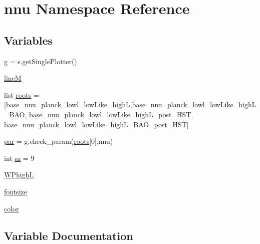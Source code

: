 \hypertarget{namespacennu}{}\section{nnu Namespace Reference}
\label{namespacennu}
\subsection*{Variables}
\begin{DoxyCompactItemize}
\item 
\mbox{\hyperlink{namespacennu_aad23f333e444d294373fe24e7fb3b692}{g}} = s.\+get\+Single\+Plotter()
\item 
\mbox{\hyperlink{namespacennu_acd5b6cec06952e5964a9e349bf5c1155}{lineM}}
\item 
list \mbox{\hyperlink{namespacennu_af565fbca18851eea4ad5e271bb575879}{roots}} = \mbox{[}\textquotesingle{}base\+\_\+nnu\+\_\+planck\+\_\+lowl\+\_\+low\+Like\+\_\+highL\textquotesingle{},\textquotesingle{}base\+\_\+nnu\+\_\+planck\+\_\+lowl\+\_\+low\+Like\+\_\+high\+L\+\_\+\+B\+AO\textquotesingle{}, \textquotesingle{}base\+\_\+nnu\+\_\+planck\+\_\+lowl\+\_\+low\+Like\+\_\+high\+L\+\_\+post\+\_\+\+H\+ST\textquotesingle{}, \textquotesingle{}base\+\_\+nnu\+\_\+planck\+\_\+lowl\+\_\+low\+Like\+\_\+high\+L\+\_\+\+B\+A\+O\+\_\+post\+\_\+\+H\+ST\textquotesingle{}\mbox{]}
\item 
\mbox{\hyperlink{namespacennu_a18197daa66fc4578a031ccee0a4aabe0}{par}} = g.\+check\+\_\+param(\mbox{\hyperlink{namespacennu_af565fbca18851eea4ad5e271bb575879}{roots}}\mbox{[}0\mbox{]},\textquotesingle{}nnu\textquotesingle{})
\item 
int \mbox{\hyperlink{namespacennu_af8e35d5250adf719a032586f6db1fed8}{sz}} = 9
\item 
\mbox{\hyperlink{namespacennu_a615a063c1e0eb85059f8ea3d6ad9c498}{W\+PhighL}}
\item 
\mbox{\hyperlink{namespacennu_a6ad51dd7b3acf681ddd09ec4a3d7c2d5}{fontsize}}
\item 
\mbox{\hyperlink{namespacennu_a42066071c7ba4fd4651ff37ad0321034}{color}}
\end{DoxyCompactItemize}


\subsection{Variable Documentation}
\mbox{\label{namespacennu_a42066071c7ba4fd4651ff37ad0321034}} 
